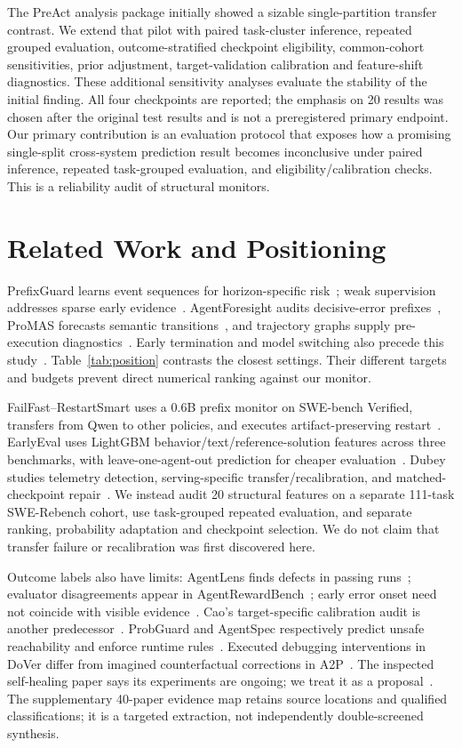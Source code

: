 \documentclass[conference]{IEEEtran}
\begin{document}
The PreAct analysis package initially showed a sizable single-partition transfer contrast. We extend that pilot with paired task-cluster inference, repeated grouped evaluation, outcome-stratified checkpoint eligibility, common-cohort sensitivities, prior adjustment, target-validation calibration and feature-shift diagnostics. These additional sensitivity analyses evaluate the stability of the initial finding. All four checkpoints are reported; the emphasis on 20 results was chosen after the original test results and is not a preregistered primary endpoint. Our primary contribution is an evaluation protocol that exposes how a promising single-split cross-system prediction result becomes inconclusive under paired inference, repeated task-grouped evaluation, and eligibility/calibration checks. This is a reliability audit of structural monitors.

\section{Related Work and Positioning}
PrefixGuard learns event sequences for horizon-specific risk~\cite{prefixguard}; weak supervision addresses sparse early evidence~\cite{sparse}. AgentForesight audits decisive-error prefixes~\cite{agentforesight}, ProMAS forecasts semantic transitions~\cite{promas}, and trajectory graphs supply pre-execution diagnostics~\cite{graphcopilot}. Early termination and model switching also precede this study~\cite{agentstop,atropos}. Table~\ref{tab:position} contrasts the closest settings. Their different targets and budgets prevent direct numerical ranking against our monitor.

FailFast--RestartSmart uses a 0.6B prefix monitor on SWE-bench Verified, transfers from Qwen to other policies, and executes artifact-preserving restart~\cite{failfast}. EarlyEval uses LightGBM behavior/text/reference-solution features across three benchmarks, with leave-one-agent-out prediction for cheaper evaluation~\cite{earlyeval}. Dubey studies telemetry detection, serving-specific transfer/recalibration, and matched-checkpoint repair~\cite{sentinel}. We instead audit 20 structural features on a separate 111-task SWE-Rebench cohort, use task-grouped repeated evaluation, and separate ranking, probability adaptation and checkpoint selection. We do not claim that transfer failure or recalibration was first discovered here.

Outcome labels also have limits: AgentLens finds defects in passing runs~\cite{agentlens}; evaluator disagreements appear in AgentRewardBench~\cite{agentrewardbench}; early error onset need not coincide with visible evidence~\cite{failureprocess}. Cao's target-specific calibration audit is another predecessor~\cite{calibrationaudit}. ProbGuard and AgentSpec respectively predict unsafe reachability and enforce runtime rules~\cite{probguard,agentspec}. Executed debugging interventions in DoVer differ from imagined counterfactual corrections in A2P~\cite{dover,a2p}. The inspected self-healing paper says its experiments are ongoing; we treat it as a proposal~\cite{selfhealing}. The supplementary 40-paper evidence map retains source locations and qualified classifications; it is a targeted extraction, not independently double-screened synthesis.
\end{document}

